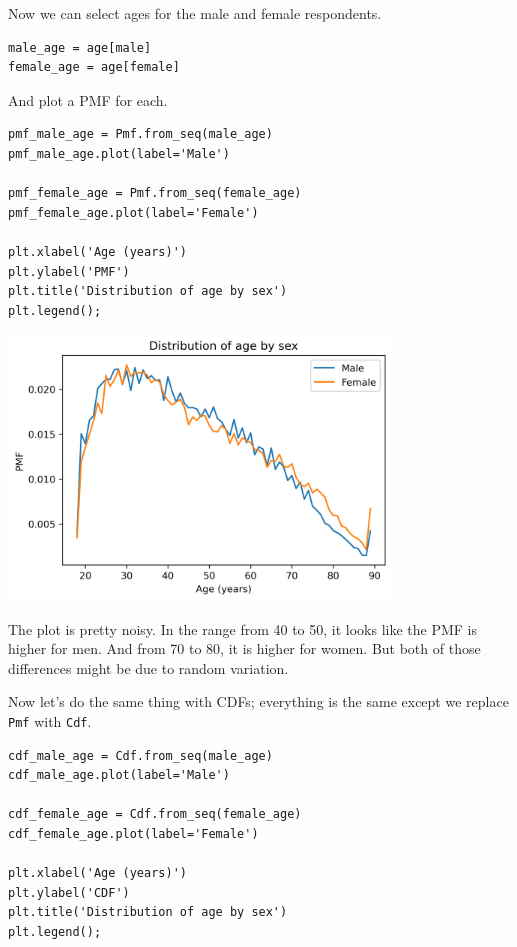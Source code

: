 Now we can select ages for the male and female respondents.

\begin{lstlisting}[]
male_age = age[male]
female_age = age[female]
\end{lstlisting}

And plot a PMF for each.

\begin{lstlisting}[]
pmf_male_age = Pmf.from_seq(male_age)
pmf_male_age.plot(label='Male')

pmf_female_age = Pmf.from_seq(female_age)
pmf_female_age.plot(label='Female')

plt.xlabel('Age (years)') 
plt.ylabel('PMF')
plt.title('Distribution of age by sex')
plt.legend();
\end{lstlisting}

\begin{center}
\includegraphics[width=4in]{chapters/08_distributions_files/08_distributions_88_0.png}
\end{center}

The plot is pretty noisy. In the range from 40 to 50, it looks like the
PMF is higher for men. And from 70 to 80, it is higher for women. But
both of those differences might be due to random variation.

Now let's do the same thing with CDFs; everything is the same except we
replace \passthrough{\lstinline!Pmf!} with
\passthrough{\lstinline!Cdf!}.

\begin{lstlisting}[]
cdf_male_age = Cdf.from_seq(male_age)
cdf_male_age.plot(label='Male')

cdf_female_age = Cdf.from_seq(female_age)
cdf_female_age.plot(label='Female')

plt.xlabel('Age (years)') 
plt.ylabel('CDF')
plt.title('Distribution of age by sex')
plt.legend();
\end{lstlisting}

